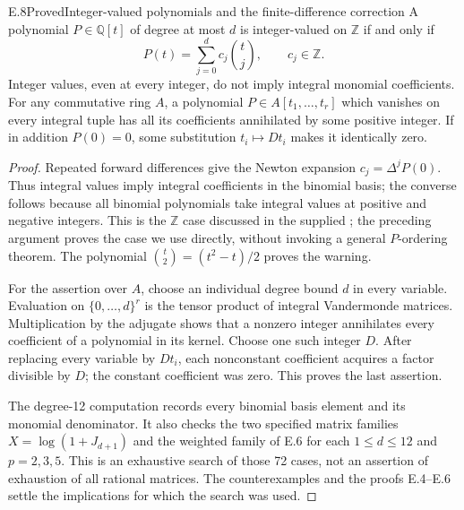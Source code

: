 \begin{statement}{E.8}{Proved}{Integer-valued polynomials and the finite-difference correction}
A polynomial \(P\in\mathbb Q[t]\) of degree at most \(d\) is
integer-valued on \(\mathbb Z\) if and only if
\[
             P(t)=\sum_{j=0}^d c_j\binom tj,\qquad c_j\in\mathbb Z.
\]
Integer values, even at every integer, do not imply integral monomial
coefficients.  For any commutative ring \(A\), a polynomial
\(P\in A[t_1,\ldots,t_r]\) which vanishes on every integral tuple
has all its coefficients annihilated by some positive integer.
If in addition \(P(0)=0\), some substitution
\(t_i\mapsto Dt_i\) makes it identically zero.
\end{statement}
\begin{proof}
Repeated forward differences give the Newton expansion
\(c_j=\Delta^jP(0)\).  Thus integral values imply integral coefficients
in the binomial basis; the converse follows because all binomial
polynomials take integral values at positive and negative integers.
This is the \(\mathbb Z\) case discussed in the supplied
\citet[\S1, p.~964]{E_Bhargava2009}; the preceding argument proves the
case we use directly, without invoking a general \(P\)-ordering theorem.
The polynomial \(\binom t2=(t^2-t)/2\) proves the warning.

For the assertion over \(A\), choose an individual degree bound \(d\)
in every variable.  Evaluation on \(\{0,\ldots,d\}^r\) is the tensor
product of integral Vandermonde matrices.  Multiplication by the
adjugate shows that a nonzero integer annihilates every coefficient
of a polynomial in its kernel.  Choose one such integer \(D\).
After replacing every variable by \(Dt_i\), each nonconstant
coefficient acquires a factor divisible by \(D\); the constant
coefficient was zero.  This proves the last assertion.

The degree-12 computation records every binomial basis element and
its monomial denominator.  It also checks the two specified matrix
families \(X=\log(1+J_{d+1})\) and the weighted family of E.6 for
each \(1\leq d\leq12\) and \(p=2,3,5\).  This is an exhaustive
search of those 72 cases, not an assertion of exhaustion of all
rational matrices.  The counterexamples and the proofs E.4--E.6
settle the implications for which the search was used.


\end{proof}

